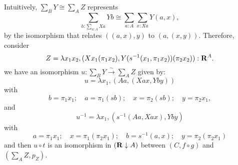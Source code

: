 \begin{enumerate}
\begin{center}
    \end{center}
    Intuitively, $ \sum_B Y \cong \sum_A Z $ represents
    \[ \sum_{b: \sum_{a: A} X a} Y b \cong \sum_{a: A} \sum_{x: X a} Y(a, x), \]
    by the isomorphism that relates $ ((a, x), y) $ to $ (a, (x, y)) $. Therefore, consider
    \[ Z = \lambda x_1 x_2, (X x_1 (\pi_1 x_2), Y (s^{-1} (x_1, \pi_1 x_2)) (\pi_2 x_2)): \mathbf{R}^A. \]
    we have an isomorphism $ u: \sum_B Y \xrightarrow \sim \sum_A Z $ given by:
    \[ u = \lambda x_1, (A a, (X a x, Y b y)) \]
    with
    \[ b = \pi_1 x_1;\quad a = \pi_1 (s b); \quad x = \pi_2 (s b); \quad y = \pi_2 x_1, \]
    and
    \[ u^{-1} = \lambda x_1, (s^{-1}(A a, X a x), Y b y) \]
    with
    \[ a = \pi_1 x_1; \quad x = \pi_1 (\pi_2 x_1); \quad b = s^{-1}(a, x); \quad y = \pi_2 (\pi_2 x_1) \]
    and then $ u \circ t $ is an isomorphism in $ (\mathbf{R} \downarrow A) $ between $ (C, f \circ g) $ and $ (\sum_A Z, p_Z) $.


\end{enumerate}
